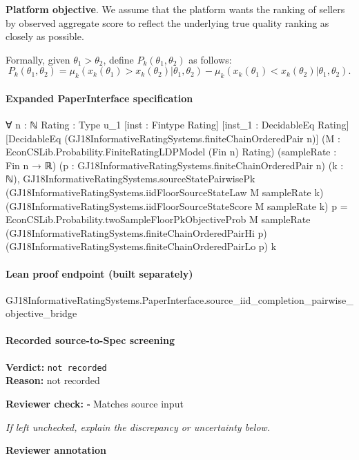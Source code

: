 \documentclass[10pt]{article}
\newcommand{\reviewerbox}{%
  \par\noindent\fbox{\parbox{0.96\linewidth}{\rule{0pt}{0.38in}}}\par
}
\newcommand{\reviewmatch}[1]{%
  \par\noindent\textbf{Reviewer check:} $\square$\; #1\par
  \noindent\emph{If left unchecked, explain the discrepancy or uncertainty below.}\par
}
\begin{document}
\begin{ReviewVerbatim}
{\bf Platform objective}.  We assume that the platform wants the ranking of sellers by observed aggregate score to reflect the underlying true quality ranking as closely as possible.

Formally, given $\theta_1 > \theta_2$, define $P_k(\theta_1, \theta_2)$ as follows:
\begin{equation}
\label{eq:Pk}
P_k(\theta_1, \theta_2) = \mu_k(x_k(\theta_1) > x_k(\theta_2)|\theta_1, \theta_2) - \mu_k(x_k(\theta_1) < x_k(\theta_2)|\theta_1, \theta_2).
\end{equation}
\end{ReviewVerbatim}


\paragraph{Expanded PaperInterface specification}
\begin{ReviewVerbatim}
∀ {n : ℕ} {Rating : Type u_1} [inst : Fintype Rating] [inst_1 : DecidableEq Rating]
  [DecidableEq (GJ18InformativeRatingSystems.finiteChainOrderedPair n)]
  (M : EconCSLib.Probability.FiniteRatingLDPModel (Fin n) Rating) (sampleRate : Fin n → ℝ)
  (p : GJ18InformativeRatingSystems.finiteChainOrderedPair n) (k : ℕ),
  GJ18InformativeRatingSystems.sourceStatePairwisePk
      (GJ18InformativeRatingSystems.iidFloorSourceStateLaw M sampleRate k)
      (GJ18InformativeRatingSystems.iidFloorSourceStateScore M sampleRate k) p =
    EconCSLib.Probability.twoSampleFloorPkObjectiveProb M sampleRate
      (GJ18InformativeRatingSystems.finiteChainOrderedPairHi p)
      (GJ18InformativeRatingSystems.finiteChainOrderedPairLo p) k
\end{ReviewVerbatim}

\paragraph{Lean proof endpoint (built separately)}\begin{ReviewVerbatim}
GJ18InformativeRatingSystems.PaperInterface.source_iid_completion_pairwise_objective_bridge
\end{ReviewVerbatim}

\paragraph{Recorded source-to-Spec screening}
\textbf{Verdict:} \texttt{not recorded}
\\
\textbf{Reason:} not recorded
\reviewmatch{Matches source input}
\noindent\textbf{Reviewer annotation}\par
\reviewerbox
\clearpage
\hypertarget{source-claim-28e9ead3a5c0a6ce}{}
\end{document}
